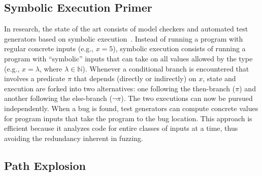 

\subsection{Symbolic Execution Primer}

In research, the state of the art consists of model checkers and automated test generators based on symbolic execution~\cite{dart,klee}.  Instead of running a program with regular concrete inputs (e.g., $x\!=\!5$), symbolic execution consists of running a program with ``symbolic'' inputs that can take on all values allowed by the type (e.g., $x\!=\!\lambda$, where $\lambda \in \mathbb{N}$).  Whenever a conditional branch is encountered that involves a predicate $\pi$ that depends (directly or indirectly) on $x$, state and execution are forked into two alternatives: one following the then-branch ($\pi$) and another following the else-branch ($\neg \pi$). The two executions can now be pursued independently.  When a bug is found, test generators can compute concrete values for program inputs that take the program to the bug location.  This approach is efficient because it analyzes code for entire classes of inputs at a time, thus avoiding the redundancy inherent in fuzzing.

\subsection{Path Explosion}


